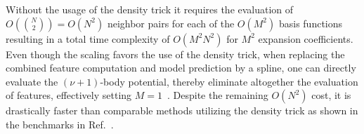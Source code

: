 Without the usage of the density trick it requires the evaluation of $O({N\choose 2}) = O(N^2)$ neighbor pairs for each of the $O(M^2)$ basis functions resulting in a total time complexity of $O(M^2N^2)$ for $M^2$ expansion coefficients.
Even though the scaling favors the use of the density trick, when replacing the combined feature computation and model prediction by a spline, one can directly evaluate the $(\nu+1)$-body potential, thereby eliminate altogether the evaluation of features, effectively setting $M=1$~\cite{pozdnyakov2019fast,xie2023ultra}.
Despite the remaining $O(N^2)$ cost, it is drastically faster than comparable methods utilizing the density trick as shown in the benchmarks in Ref.~\cite{xie2023ultra}. 

